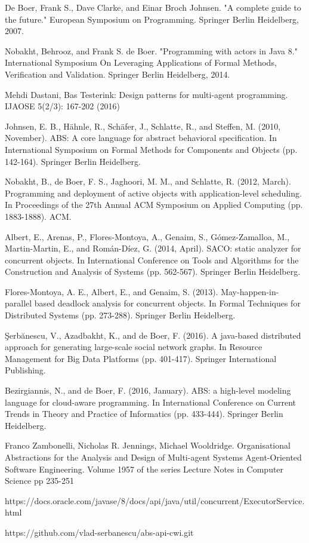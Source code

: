 \documentclass[runningheads,a4paper]{llncs}
\begin{document}
\begin{thebibliography}{4}
		De Boer, Frank S., Dave Clarke, and Einar Broch Johnsen. "A complete guide to the future." European Symposium on Programming. Springer Berlin Heidelberg, 2007.
		
		 Nobakht, Behrooz, and Frank S. de Boer. "Programming with actors in Java 8." International Symposium On Leveraging Applications of Formal Methods, Verification and Validation. Springer Berlin Heidelberg, 2014.
		
		 Mehdi Dastani, Bas Testerink:
		Design patterns for multi-agent programming. IJAOSE 5(2/3): 167-202 (2016)
		
		 Johnsen, E. B., Hähnle, R., Schäfer, J., Schlatte, R., and Steffen, M. (2010, November). ABS: A core language for abstract behavioral specification. In International Symposium on Formal Methods for Components and Objects (pp. 142-164). Springer Berlin Heidelberg.
		
		 Nobakht, B., de Boer, F. S., Jaghoori, M. M., and Schlatte, R. (2012, March). Programming and deployment of active objects with application-level scheduling. In Proceedings of the 27th Annual ACM Symposium on Applied Computing (pp. 1883-1888). ACM.
		
		 Albert, E., Arenas, P., Flores-Montoya, A., Genaim, S., Gómez-Zamalloa, M., Martin-Martin, E., and Román-Díez, G. (2014, April). SACO: static analyzer for concurrent objects. In International Conference on Tools and Algorithms for the Construction and Analysis of Systems (pp. 562-567). Springer Berlin Heidelberg.
		
		Flores-Montoya, A. E., Albert, E., and Genaim, S. (2013). May-happen-in-parallel based deadlock analysis for concurrent objects. In Formal Techniques for Distributed Systems (pp. 273-288). Springer Berlin Heidelberg.
		
		Şerbănescu, V., Azadbakht, K., and de Boer, F. (2016). A java-based distributed approach for generating large-scale social network graphs. In Resource Management for Big Data Platforms (pp. 401-417). Springer International Publishing.
		
		 Bezirgiannis, N., and de Boer, F. (2016, January). ABS: a high-level modeling language for cloud-aware programming. In International Conference on Current Trends in Theory and Practice of Informatics (pp. 433-444). Springer Berlin Heidelberg.
		
		Franco Zambonelli, Nicholas R. Jennings, Michael Wooldridge. 
		Organisational Abstractions for the Analysis and Design of Multi-agent Systems
		Agent-Oriented Software Engineering. Volume 1957 of the series Lecture Notes in Computer Science pp 235-251
		
		 https://docs.oracle.com/javase/8/docs/api/java/util/concurrent/ExecutorService.html
		
		https://github.com/vlad-serbanescu/abs-api-cwi.git
	\end{thebibliography}
	
	
	
\end{document}
